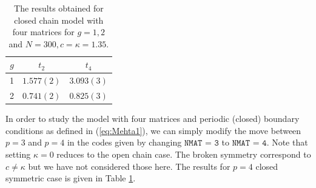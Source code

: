 \documentclass[letter,11pt]{article}
\begin{document}
\begin{table}[h!]
	\centering
	\begin{tabular}{||c c c||} 
		\hline
		$g$ & $ t_2 $ & $t_4 $ \\ [0.5ex] 
		\hline\hline
		1 & $ 1.577(2) $ & $3.093(3)$ \\
		2 & $ 0.741(2)$ & $0.825(3) $  
		\\ [1ex] 
		\hline 
	\end{tabular}
	\caption{The results obtained for closed chain model with four matrices for $g=1,2$ and $N=300, c=\kappa=1.35$.}
	\label{table:4mchain_data}
\end{table}

In order to study the model with four matrices and periodic (closed) boundary conditions 
as defined in (\ref{eq:Mehta1}), we can simply modify the move between $p=3$ and $p=4$ in the codes given by changing $\texttt{NMAT = 3}$ to  $\texttt{NMAT = 4}$. Note that setting $\kappa=0$ reduces to the open chain case. The broken symmetry correspond to $ c \neq \kappa$ but we have not considered those here. The results for $p=4$ closed symmetric case is given in Table \ref{table:4mchain_data}. 

\end{document}
